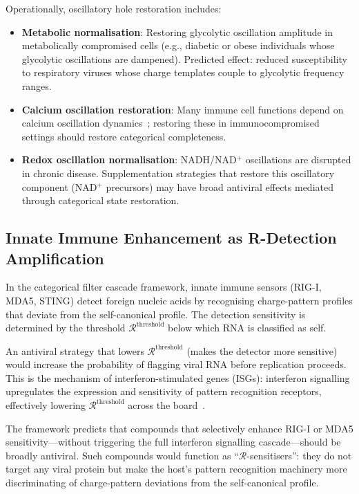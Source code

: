 \documentclass[11pt,twocolumn,a4paper]{article}
\theoremstyle{definition}
\theoremstyle{remark}
\newcommand{\Rcat}{\mathcal{R}}
\begin{document}
Operationally, oscillatory hole restoration includes:
\begin{itemize}
  \item \textbf{Metabolic normalisation}: Restoring glycolytic oscillation amplitude in metabolically compromised cells (e.g., diabetic or obese individuals whose glycolytic oscillations are dampened). Predicted effect: reduced susceptibility to respiratory viruses whose charge templates couple to glycolytic frequency ranges.
  \item \textbf{Calcium oscillation restoration}: Many immune cell functions depend on calcium oscillation dynamics~\cite{Berridge1997}; restoring these in immunocompromised settings should restore categorical completeness.
  \item \textbf{Redox oscillation normalisation}: NADH/NAD$^+$ oscillations are disrupted in chronic disease. Supplementation strategies that restore this oscillatory component (NAD$^+$ precursors) may have broad antiviral effects mediated through categorical state restoration.
\end{itemize}

\subsection{Innate Immune Enhancement as R-Detection Amplification}

In the categorical filter cascade framework, innate immune sensors (RIG-I, MDA5, STING) detect foreign nucleic acids by recognising charge-pattern profiles that deviate from the self-canonical profile. The detection sensitivity is determined by the threshold $\Rcat^{\mathrm{threshold}}$ below which RNA is classified as self.

An antiviral strategy that lowers $\Rcat^{\mathrm{threshold}}$ (makes the detector more sensitive) would increase the probability of flagging viral RNA before replication proceeds. This is the mechanism of interferon-stimulated genes (ISGs): interferon signalling upregulates the expression and sensitivity of pattern recognition receptors, effectively lowering $\Rcat^{\mathrm{threshold}}$ across the board~\cite{Schneider2014}.

The framework predicts that compounds that selectively enhance RIG-I or MDA5 sensitivity---without triggering the full interferon signalling cascade---should be broadly antiviral. Such compounds would function as ``$\Rcat$-sensitisers'': they do not target any viral protein but make the host's pattern recognition machinery more discriminating of charge-pattern deviations from the self-canonical profile.
\end{document}
